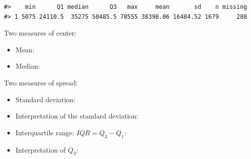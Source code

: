 \documentclass[
]{report}
\providecommand{\tightlist}{%
  \setlength{\itemsep}{0pt}\setlength{\parskip}{0pt}}
\begin{document}
\begin{verbatim}
#>    min      Q1 median      Q3   max     mean       sd    n missing
#> 1 5075 24110.5  35275 50485.5 78555 38398.06 16484.52 1679     288
\end{verbatim}

\newpage

Two measures of center:

\vspace{1mm}

\begin{itemize}
\tightlist
\item
  Mean:
\end{itemize}

\vspace{1mm}

\begin{itemize}
\tightlist
\item
  Median:
\end{itemize}

\vspace{1mm}

Two measures of spread:

\vspace{1mm}

\begin{itemize}
\tightlist
\item
  Standard deviation:
\end{itemize}

\vspace{1mm}

\begin{itemize}
\tightlist
\item
  Interpretation of the standard deviation:
\end{itemize}

\vspace{0.8in}

\begin{itemize}
\tightlist
\item
  Interquartile range: \(IQR = Q_3 - Q_1\):
\end{itemize}

\vspace{0.5in}

\begin{itemize}
\tightlist
\item
  Interpretation of \(Q_3\):
\end{itemize}

\vspace{0.8in}
\end{document}
